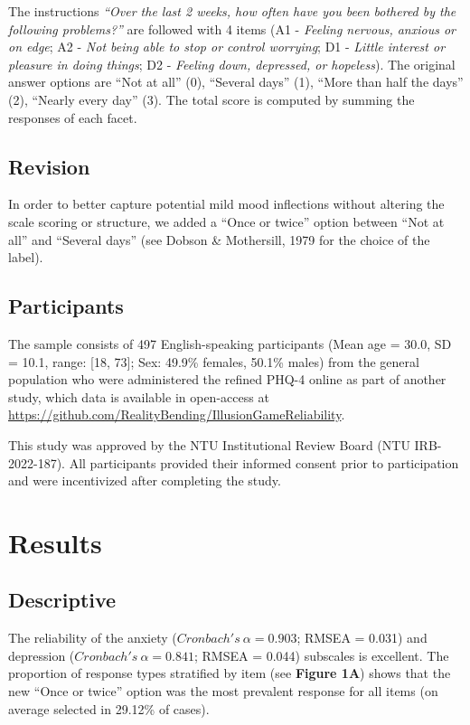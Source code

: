 \documentclass[
  man,floatsintext]{apa6}
\begin{document}
The instructions \emph{``Over the last 2 weeks, how often have you been bothered by the following problems?''} are followed with 4 items (A1 - \emph{Feeling nervous, anxious or on edge}; A2 - \emph{Not being able to stop or control worrying}; D1 - \emph{Little interest or pleasure in doing things}; D2 - \emph{Feeling down, depressed, or hopeless}). The original answer options are ``Not at all'' (0), ``Several days'' (1), ``More than half the days'' (2), ``Nearly every day'' (3). The total score is computed by summing the responses of each facet.

\hypertarget{revision}{%
\subsection{Revision}\label{revision}}

In order to better capture potential mild mood inflections without altering the scale scoring or structure, we added a ``Once or twice'' option between ``Not at all'' and ``Several days'' (see Dobson \& Mothersill, 1979 for the choice of the label).

\hypertarget{participants}{%
\subsection{Participants}\label{participants}}

The sample consists of 497 English-speaking participants (Mean age = 30.0, SD = 10.1, range: {[}18, 73{]}; Sex: 49.9\% females, 50.1\% males) from the general population who were administered the refined PHQ-4 online as part of another study, which data is available in open-access at \url{https://github.com/RealityBending/IllusionGameReliability}.

This study was approved by the NTU Institutional Review Board (NTU IRB-2022-187). All participants provided their informed consent prior to participation and were incentivized after completing the study.

\hypertarget{results}{%
\section{Results}\label{results}}

\hypertarget{descriptive}{%
\subsection{Descriptive}\label{descriptive}}

The reliability of the anxiety (\(Cronbach's~\alpha = 0.903\); RMSEA = 0.031) and depression (\(Cronbach's~\alpha = 0.841\); RMSEA = 0.044) subscales is excellent. The proportion of response types stratified by item (see \textbf{Figure 1A}) shows that the new ``Once or twice'' option was the most prevalent response for all items (on average selected in 29.12\% of cases).
\end{document}
